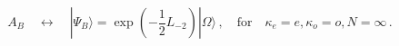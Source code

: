 \begin{equation}
A_{B}\quad \leftrightarrow \quad |\Psi _{B}\rangle =\exp \left( -{\frac{1}{2}%
}L_{-2}\right) |\Omega \rangle \,,\quad \mathrm{for}\quad \kappa
_{e}=e,\kappa _{o}=o,N=\infty \,.
\end{equation}

